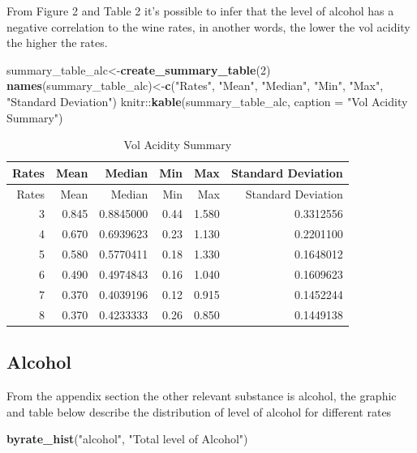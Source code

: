 \documentclass[]{article}
\newenvironment{Shaded}{\begin{snugshade}}{\end{snugshade}}
\newcommand{\KeywordTok}[1]{\textcolor[rgb]{0.13,0.29,0.53}{\textbf{{#1}}}}
\newcommand{\DataTypeTok}[1]{\textcolor[rgb]{0.13,0.29,0.53}{{#1}}}
\newcommand{\DecValTok}[1]{\textcolor[rgb]{0.00,0.00,0.81}{{#1}}}
\newcommand{\StringTok}[1]{\textcolor[rgb]{0.31,0.60,0.02}{{#1}}}
\newcommand{\NormalTok}[1]{{#1}}
\begin{document}
\newpage

From Figure 2 and Table 2 it's possible to infer that the level of
alcohol has a negative correlation to the wine rates, in another words,
the lower the vol acidity the higher the rates.

\begin{Shaded}
\begin{Highlighting}[]
\NormalTok{summary_table_alc<-}\KeywordTok{create_summary_table}\NormalTok{(}\DecValTok{2}\NormalTok{)}
\KeywordTok{names}\NormalTok{(summary_table_alc)<-}\KeywordTok{c}\NormalTok{(}\StringTok{"Rates"}\NormalTok{, }\StringTok{"Mean"}\NormalTok{, }\StringTok{"Median"}\NormalTok{, }\StringTok{"Min"}\NormalTok{, }\StringTok{"Max"}\NormalTok{, }\StringTok{"Standard Deviation"}\NormalTok{)}
\NormalTok{knitr::}\KeywordTok{kable}\NormalTok{(summary_table_alc, }\DataTypeTok{caption =} \StringTok{"Vol Acidity Summary"}\NormalTok{)}
\end{Highlighting}
\end{Shaded}

\begin{longtable}[c]{@{}rrrrrr@{}}
\caption{Vol Acidity Summary}\tabularnewline
\toprule
Rates & Mean & Median & Min & Max & Standard Deviation\tabularnewline
\midrule
\endfirsthead
\toprule
Rates & Mean & Median & Min & Max & Standard Deviation\tabularnewline
\midrule
\endhead
3 & 0.845 & 0.8845000 & 0.44 & 1.580 & 0.3312556\tabularnewline
4 & 0.670 & 0.6939623 & 0.23 & 1.130 & 0.2201100\tabularnewline
5 & 0.580 & 0.5770411 & 0.18 & 1.330 & 0.1648012\tabularnewline
6 & 0.490 & 0.4974843 & 0.16 & 1.040 & 0.1609623\tabularnewline
7 & 0.370 & 0.4039196 & 0.12 & 0.915 & 0.1452244\tabularnewline
8 & 0.370 & 0.4233333 & 0.26 & 0.850 & 0.1449138\tabularnewline
\bottomrule
\end{longtable}

\subsection{Alcohol}\label{alcohol}

From the appendix section the other relevant substance is alcohol, the
graphic and table below describe the distribution of level of alcohol
for different rates

\newpage

\begin{Shaded}
\begin{Highlighting}[]
\KeywordTok{byrate_hist}\NormalTok{(}\StringTok{"alcohol"}\NormalTok{, }\StringTok{"Total level of Alcohol"}\NormalTok{)}
\end{Highlighting}
\end{Shaded}
\end{document}
